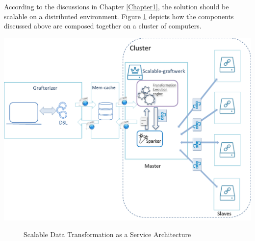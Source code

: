 According to the discussions in Chapter \ref{Chapter1}, the solution should be scalable on a distributed environment. Figure \ref{fig:architecture} depicts how the components discussed above are composed together on a cluster of computers. 
\begin{center}
	\includegraphics[width=38em]{./Figures/architecture}
	\begin{figure}[htbp]
    \caption{Scalable Data Transformation as a Service Architecture}
    \label{fig:architecture}
	\end{figure}
\end{center}
